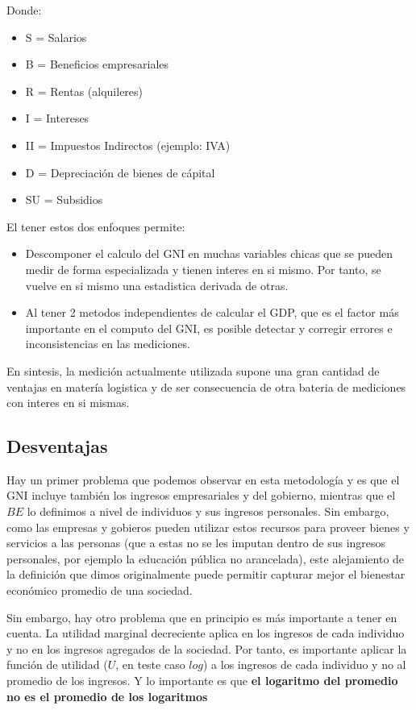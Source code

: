 \documentclass[11pt,a4paper]{tesis}
\begin{document}
Donde:
\begin{itemize}
    \item S = Salarios
    \item B = Beneficios empresariales
    \item R = Rentas (alquileres)
    \item I = Intereses
    \item II = Impuestos Indirectos (ejemplo: IVA)
    \item D = Depreciación de bienes de cápital
    \item SU = Subsidios
\end{itemize}

El tener estos dos enfoques permite:

\begin{itemize}
    \item Descomponer el calculo del GNI en muchas variables chicas que se pueden medir de forma especializada y tienen interes en si mismo. Por tanto, se vuelve en si mismo una estadistica derivada de otras.
    \item Al tener 2 metodos independientes de calcular el GDP, que es el factor más importante en el computo del GNI, es posible detectar y corregir errores e inconsistencias en las mediciones.
\end{itemize}

En sintesis, la medición actualmente utilizada supone una gran cantidad de ventajas en matería logistica y de ser consecuencia de otra bateria de mediciones con interes en si mismas.

\subsection{Desventajas}

Hay un primer problema que podemos observar en esta metodología y es que el GNI incluye también los ingresos empresariales y del gobierno, mientras que el $BE$ lo definimos a nivel de individuos y sus ingresos personales. Sin embargo, como las empresas y gobieros pueden utilizar estos recursos para proveer bienes y servicios a las personas (que a estas no se les imputan dentro de sus ingresos personales, por ejemplo la educación pública no arancelada), este alejamiento de la definición que dimos originalmente puede permitir capturar mejor el bienestar económico promedio de una sociedad. 

Sin embargo, hay otro problema que en principio es más importante a tener en cuenta. La utilidad marginal decreciente aplica en los ingresos de cada individuo y no en los ingresos agregados de la sociedad. Por tanto, es importante aplicar la función de utilidad ($U$, en teste caso $log$) a los ingresos de cada individuo y no al promedio de los ingresos. Y lo importante es que \textbf{el logaritmo del promedio no es el promedio de los logaritmos}
\end{document}
